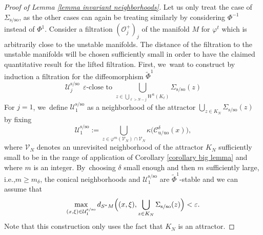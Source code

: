 \documentclass[11pt]{article}
\newcommand{\ie}{i.e.,\xspace}
\let\oldbigcup\bigcup
\newcommand{\rs}{\mathrm{s}}
\newcommand{\rso}{\mathrm{so}}
\newcommand{\ru}{\mathrm{u}}
\newcommand{\ruo}{\mathrm{uo}}
\theoremstyle{definition}
\theoremstyle{plain}
\newcommand{\Ccal}{\mathcal{C}}
\newcommand{\Ocal}{\mathcal{O}}
\newcommand{\Ucal}{\mathcal{U}}
\newcommand{\Vcal}{\mathcal{V}}
\begin{document}
\begin{proof}[Proof of Lemma \ref{lemma invariant neighborhoods}]
Let us only treat the case of $\Sigma_{\rs/\rso}$, as the other cases can again be treating similarly by considering $\Phi^{-1}$ instead of $\Phi^1$. Consider a filtration $(\Ocal_j^+)_j$ of the manifold $M$ for $\varphi^t$ which is arbitrarily close to the unstable manifolds. The distance of the filtration to the unstable manifolds will be chosen sufficiently small in order to have the claimed quantitative result for the lifted filtration. First, we~want to construct by induction a filtration for the diffeomorphism $\widetilde{\Phi}^1$
\begin{equation}\label{eq: proof lemma invariant neighborhood HR}
\Ucal_j^{\rs/\rso} \: \: \varepsilon\text{-close to } \bigcup_{z \in \oldbigcup_{\ell > N-j} W^\ru (K_\ell)} \Sigma_{\rs/\rso} (z)
\end{equation}
For $j = 1$, we~define $\Ucal_1^{\rs/\rso}$ as a neighborhood of the attractor $\bigcup_{z \in K_N} \Sigma_{\rs/\rso} (z)$ by fixing
\[
\Ucal_1^{\rs/\rso}:= \bigcup_{z \in \varphi^m (\Vcal_N) \cap \Vcal_N} \kappa \bigl(\Ccal_{\ru/\ruo}^{\delta} (x) \bigr),
\]
where $\Vcal_N$ denotes an unrevisited neighborhood of the attractor $K_N$ sufficiently small to be in the range of application of Corollary \ref{corollary big lemma} and where $m$ is an integer. By~choosing $\delta$ small enough and then $m$ sufficiently large, \ie $m \geq m_{\delta}$, the conical neighborhoods and $\Ucal_1^{\rs/\rso}$ are $\widetilde{\Phi}^1$-stable and we can assume that
\[
\max_{(x,\xi) \in \Ucal_1^{\rs/\rso}} d_{S^* M} \Bigl((x,\xi), \bigcup_{z \in K_N} \Sigma_{\rs/\rso}(z) \Bigr) < \varepsilon.
\]
Note that this construction only uses the fact that $K_N$ is an attractor.


\end{proof}
\end{document}
